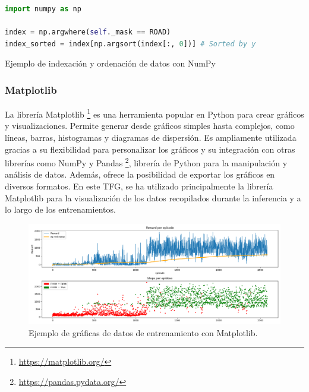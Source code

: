 \begin{code}[h]
\begin{lstlisting}[language=Python]
import numpy as np

index = np.argwhere(self._mask == ROAD)
index_sorted = index[np.argsort(index[:, 0])] # Sorted by y

\end{lstlisting}
\caption[Ejemplo de indexación y ordenación de datos con NumPy]{Ejemplo de indexación y ordenación de datos con NumPy}
\label{cod:numpy}
\end{code}

\subsubsection{Matplotlib}
\label{sec:plot}

La librería Matplotlib \footnote{\url{https://matplotlib.org/}} es una herramienta popular en Python para crear gráficos y visualizaciones. Permite generar desde gráficos simples hasta complejos, como líneas, barras, histogramas y diagramas de dispersión. Es ampliamente utilizada gracias a su flexibilidad para personalizar los gráficos y su integración con otras librerías como NumPy y Pandas \footnote{\url{https://pandas.pydata.org/}}, librería de Python para la manipulación y análisis de datos. Además, ofrece la posibilidad de exportar los gráficos en diversos formatos. En este \ac{TFG}, se ha utilizado principalmente la librería Matplotlib para la visualización de los datos recopilados durante la inferencia y a lo largo de los entrenamientos.

\begin{figure}[ht]
  \begin{center}
    \includegraphics[width=14cm]{figs/Plataformas_Desarollo/plot.png}
  \end{center}
  \caption{Ejemplo de gráficas de datos de entrenamiento con Matplotlib.}
  \label{foto_plot}
\end{figure}

